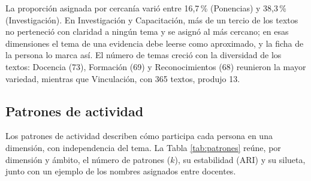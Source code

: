 La proporción asignada por cercanía varió entre 16,7\,\% (Ponencias) y 38,3\,\% (Investigación). En Investigación y Capacitación, más de un tercio de los textos no perteneció con claridad a ningún tema y se asignó al más cercano; en esas dimensiones el tema de una evidencia debe leerse como aproximado, y la ficha de la persona lo marca así. El número de temas creció con la diversidad de los textos: Docencia (73), Formación (69) y Reconocimientos (68) reunieron la mayor variedad, mientras que Vinculación, con 365 textos, produjo 13.

\subsection{Patrones de actividad}
\label{sec:res_patrones}

Los patrones de actividad describen cómo participa cada persona en una dimensión, con independencia del tema. La Tabla \ref{tab:patrones} reúne, por dimensión y ámbito, el número de patrones ($k$), su estabilidad (ARI) y su silueta, junto con un ejemplo de los nombres asignados entre docentes.

